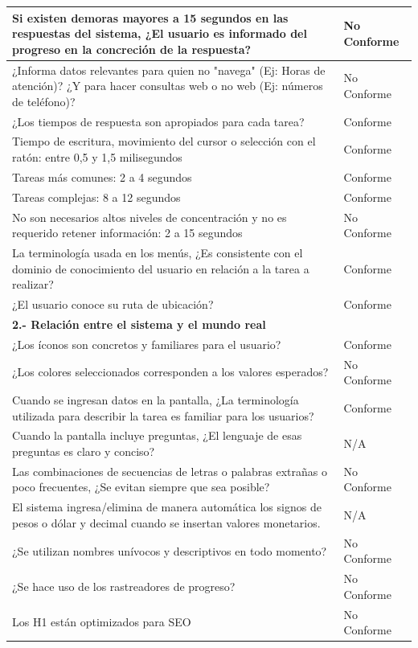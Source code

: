 \documentclass[stu, 12pt, letterpaper, donotrepeattitle, floatsintext, natbib]{apa7}
\begin{document}
\begin{longtable}{|>{\raggedright\arraybackslash}p{10cm}|>{\centering\arraybackslash}p{3cm}|}
    Si existen demoras mayores a 15 segundos en las respuestas del sistema, ¿El usuario es informado del progreso en la concreción de la respuesta? & No Conforme \\ \hline
    ¿Informa datos relevantes para quien no "navega" (Ej: Horas de atención)? ¿Y para hacer consultas web o no web (Ej: números de teléfono)? & No Conforme \\ \hline
    ¿Los tiempos de respuesta son apropiados para cada tarea? & Conforme \\ \hline
    Tiempo de escritura, movimiento del cursor o selección con el ratón: entre 0,5 y 1,5 milisegundos & Conforme \\ \hline
    Tareas más comunes: 2 a 4 segundos & Conforme \\ \hline
    Tareas complejas: 8 a 12 segundos & Conforme \\ \hline
    No son necesarios altos niveles de concentración y no es requerido retener información: 2 a 15 segundos & No Conforme\\ \hline
    La terminología usada en los menús, ¿Es consistente con el dominio de conocimiento del usuario en relación a la tarea a realizar? & Conforme \\ \hline
    ¿El usuario conoce su ruta de ubicación? & Conforme \\ \hline
    
    \textbf{2.- Relación entre el sistema y el mundo real} & \\ \hline
    ¿Los íconos son concretos y familiares para el usuario? & Conforme \\ \hline
    ¿Los colores seleccionados corresponden a los valores esperados? & No Conforme \\ \hline
    Cuando se ingresan datos en la pantalla, ¿La terminología utilizada para describir la tarea es familiar para los usuarios? & Conforme \\ \hline
    Cuando la pantalla incluye preguntas, ¿El lenguaje de esas preguntas es claro y conciso? & N/A \\ \hline
    Las combinaciones de secuencias de letras o palabras extrañas o poco frecuentes, ¿Se evitan siempre que sea posible? & No Conforme\\ \hline
    El sistema ingresa/elimina de manera automática los signos de pesos o dólar y decimal cuando se insertan valores monetarios. & N/A\\ \hline
    ¿Se utilizan nombres unívocos y descriptivos en todo momento? & No Conforme \\ \hline
    ¿Se hace uso de los rastreadores de progreso? & No Conforme\\ \hline
    Los H1 están optimizados para SEO & No Conforme \\ \hline
    

\end{longtable}
\end{document}
